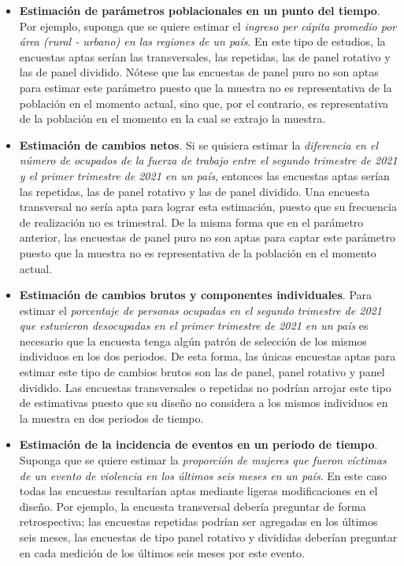 \documentclass[
  10pt,
  spanish,
]{book}
\begin{document}
\begin{itemize}
\item
  \textbf{Estimación de parámetros poblacionales en un punto del tiempo}. Por ejemplo, suponga que se quiere estimar el \emph{ingreso per cápita promedio por área (rural - urbano) en las regiones de un país}. En este tipo de estudios, la encuestas aptas serían las transversales, las repetidas, las de panel rotativo y las de panel dividido. Nótese que las encuestas de panel puro no son aptas para estimar este parámetro puesto que la muestra no es representativa de la población en el momento actual, sino que, por el contrario, es representativa de la población en el momento en la cual se extrajo la muestra.
\item
  \textbf{Estimación de cambios netos}. Si se quisiera estimar la \emph{diferencia en el número de ocupados de la fuerza de trabajo entre el segundo trimestre de 2021 y el primer trimestre de 2021 en un país}, entonces las encuestas aptas serían las repetidas, las de panel rotativo y las de panel dividido. Una encuesta transversal no sería apta para lograr esta estimación, puesto que su frecuencia de realización no es trimestral. De la misma forma que en el parámetro anterior, las encuestas de panel puro no son aptas para captar este parámetro puesto que la muestra no es representativa de la población en el momento actual.
\item
  \textbf{Estimación de cambios brutos y componentes individuales}. Para estimar el \emph{porcentaje de personas ocupadas en el segundo trimestre de 2021 que estuvieron desocupadas en el primer trimestre de 2021 en un país} es necesario que la encuesta tenga algún patrón de selección de los mismos individuos en los dos periodos. De esta forma, las únicas encuestas aptas para estimar este tipo de cambios brutos son las de panel, panel rotativo y panel dividido. Las encuestas transversales o repetidas no podrían arrojar este tipo de estimativas puesto que su diseño no considera a los mismos individuos en la muestra en dos periodos de tiempo.
\item
  \textbf{Estimación de la incidencia de eventos en un periodo de tiempo}. Suponga que se quiere estimar la \emph{proporción de mujeres que fueron víctimas de un evento de violencia en los últimos seis meses en un país}. En este caso todas las encuestas resultarían aptas mediante ligeras modificaciones en el diseño. Por ejemplo, la encuesta transversal debería preguntar de forma retrospectiva; las encuestas repetidas podrían ser agregadas en los últimos seis meses, las encuestas de tipo panel rotativo y divididas deberían preguntar en cada medición de los últimos seis meses por este evento.

\end{itemize}
\end{document}
